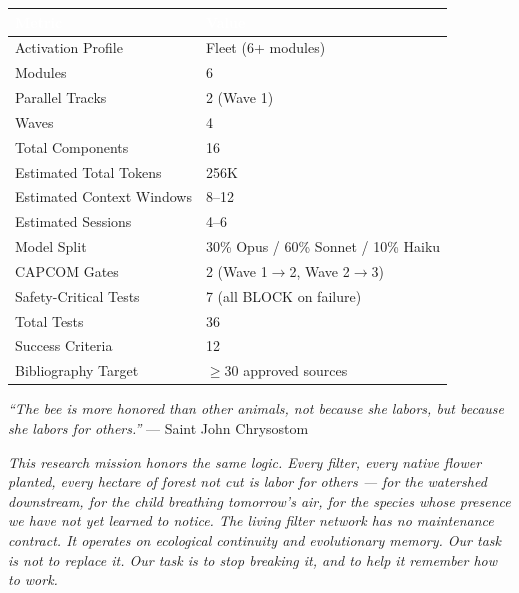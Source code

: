 \documentclass[11pt,letterpaper]{article}
\newcommand{\tableheader}[1]{\textbf{\sffamily\textcolor{white}{#1}}}
\begin{document}
\begin{center}
\begin{tabularx}{\textwidth}{L{5cm}X}
\toprule
{}
\tableheader{Metric} & \tableheader{Value} \\
\midrule
Activation Profile & Fleet (6+ modules) \\
Modules & 6 \\
Parallel Tracks & 2 (Wave 1) \\
Waves & 4 \\
Total Components & 16 \\
Estimated Total Tokens & 256K \\
Estimated Context Windows & 8--12 \\
Estimated Sessions & 4--6 \\
Model Split & 30\% Opus / 60\% Sonnet / 10\% Haiku \\
CAPCOM Gates & 2 (Wave 1$\to$2, Wave 2$\to$3) \\
Safety-Critical Tests & 7 (all BLOCK on failure) \\
Total Tests & 36 \\
Success Criteria & 12 \\
Bibliography Target & $\geq$30 approved sources \\
\bottomrule
\end{tabularx}
\end{center}

\vspace{2em}

\begin{quotebox}
\textit{``The bee is more honored than other animals, not because she labors, but because she labors for others.''} --- Saint John Chrysostom

\vspace{0.8em}

\textit{This research mission honors the same logic. Every filter, every native flower planted, every hectare of forest not cut is labor for others --- for the watershed downstream, for the child breathing tomorrow's air, for the species whose presence we have not yet learned to notice. The living filter network has no maintenance contract. It operates on ecological continuity and evolutionary memory. Our task is not to replace it. Our task is to stop breaking it, and to help it remember how to work.}
\end{quotebox}
\end{document}
